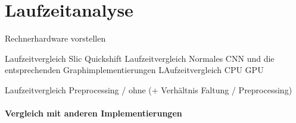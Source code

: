 \section{Laufzeitanalyse}
\label{laufzeitanalyse}

Rechnerhardware vorstellen

Laufzeitvergleich Slic Quickshift
Laufzeitvergleich Normales CNN und die entsprechenden Graphimplementierungen
LAufzeitvergleich CPU GPU

Laufzeitvergleich Preprocessing / ohne (+ Verhältnis Faltung / Preprocessing)


\paragraph{Vergleich mit anderen Implementierungen}
\label{vergleich_laufzeit}
